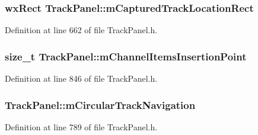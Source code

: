 \subsubsection[{\texorpdfstring{m\+Captured\+Track\+Location\+Rect}{mCapturedTrackLocationRect}}]{\setlength{\rightskip}{0pt plus 5cm}wx\+Rect Track\+Panel\+::m\+Captured\+Track\+Location\+Rect\hspace{0.3cm}{\ttfamily [protected]}}\hypertarget{class_track_panel_a44a5105dcf9ca8fa6f1a585b61bb8b58}{}\label{class_track_panel_a44a5105dcf9ca8fa6f1a585b61bb8b58}


Definition at line 662 of file Track\+Panel.\+h.

\subsubsection[{\texorpdfstring{m\+Channel\+Items\+Insertion\+Point}{mChannelItemsInsertionPoint}}]{\setlength{\rightskip}{0pt plus 5cm}size\+\_\+t Track\+Panel\+::m\+Channel\+Items\+Insertion\+Point\hspace{0.3cm}{\ttfamily [protected]}}\hypertarget{class_track_panel_a847d9d632b66b1f203b2ca2a8afde94e}{}\label{class_track_panel_a847d9d632b66b1f203b2ca2a8afde94e}


Definition at line 846 of file Track\+Panel.\+h.

\subsubsection[{\texorpdfstring{m\+Circular\+Track\+Navigation}{mCircularTrackNavigation}}]{ Track\+Panel\+::m\+Circular\+Track\+Navigation\hspace{0.3cm}{\ttfamily [protected]}}\hypertarget{class_track_panel_af02524f80a857fce1fc05853ea880e76}{}\label{class_track_panel_af02524f80a857fce1fc05853ea880e76}


Definition at line 789 of file Track\+Panel.\+h.

